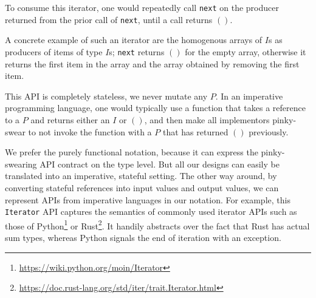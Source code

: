 \documentclass[sigplan,screen,10pt,review]{acmart}
\begin{document}
To consume this iterator, one would repeatedly call \texttt{next} on the producer returned from the prior call of \texttt{next}, until a call returns $()$.

A concrete example of such an iterator are the homogenous arrays of $I$s as producers of items of type $I$s; \texttt{next} returns $()$ for the empty array, otherwise it returns the first item in the array and the array obtained by removing the first item.

This API is completely stateless, we never mutate any $P$. In an imperative programming language, one would typically use a function that takes a reference to a $P$ and returns either an $I$ or $()$, and then make all implementors pinky-swear to not invoke the function with a $P$ that has returned $()$ previously.

We prefer the purely functional notation, because it can express the pinky-swearing API contract on the type level. But all our designs can easily be translated into an imperative, stateful setting. The other way around, by converting stateful references into input values and output values, we can represent APIs from imperative languages in our notation. For example, this \texttt{Iterator} API captures the semantics of commonly used iterator APIs such as those of Python\footnote{\url{https://wiki.python.org/moin/Iterator}} or Rust\footnote{\url{https://doc.rust-lang.org/std/iter/trait.Iterator.html}}. It handily abstracts over the fact that Rust has actual sum types, whereas Python signals the end of iteration with an exception.


\end{document}
